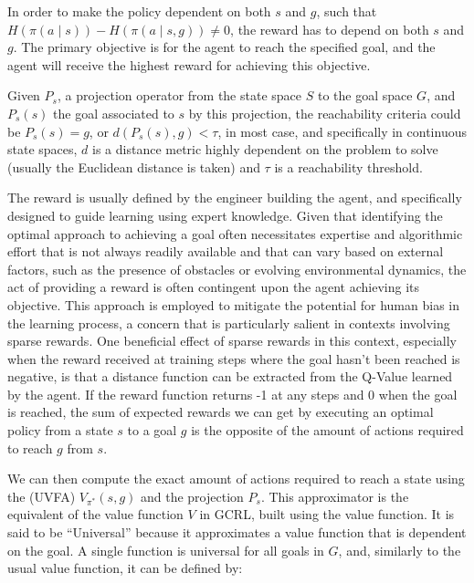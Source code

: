 In order to make the policy dependent on both $s$ and $g$, such that  $H\left(\pi(a \mid s)\right) - H\left(\pi(a \mid s, g)\right) \neq 0$, the
reward has to depend on both $s$ and $g$. %
The primary objective is for the agent to reach the specified goal, and the agent will receive the highest reward for achieving this objective.

Given $P_s$, a projection operator from the state space $S$ to the goal space $G$, and $P_s(s)$ the goal associated to
$s$ by this projection, the reachability criteria could be $P_s(s) = g$, or $d(P_s(s), g) < \tau$, in most case, and
specifically in continuous state spaces,  $d$  is a distance metric highly dependent on the problem to solve (usually
the Euclidean distance is taken) and $\tau$ is a reachability threshold. %

The reward is usually defined by the engineer building the agent, and specifically designed to guide learning using
expert knowledge.
Given that identifying the optimal approach to achieving a goal often necessitates expertise and algorithmic effort
that is not always readily available and that can vary based on external factors,
such as the presence of obstacles or evolving environmental dynamics,
the act of providing a reward is often contingent upon the agent achieving its objective.
This approach is employed to mitigate the potential for human bias in the learning process,
a concern that is particularly salient in contexts involving sparse rewards.
One beneficial effect of sparse rewards in this context, especially when the reward received at training steps
where the goal hasn't been reached is negative, is that a distance function can be extracted from the Q-Value learned by
the agent.
If the reward function returns -1 at any steps and 0 when the goal is reached, the sum of expected rewards we can get by
executing an optimal policy from a state $s$ to a goal $g$ is the opposite of the amount of actions required to
reach $g$ from $s$.

We can then compute the exact amount of actions required to reach a state using the  (UVFA)
$V_{\pi^*}(s, g)$ and the projection $P_s$.
This approximator is the equivalent of the value function $V$ in GCRL, built using the value function.
It is said to be ``Universal'' because it approximates a value function that is dependent on the goal.
A single function is universal for all goals in $G$, and, similarly to the usual value function, it can
be defined by:

